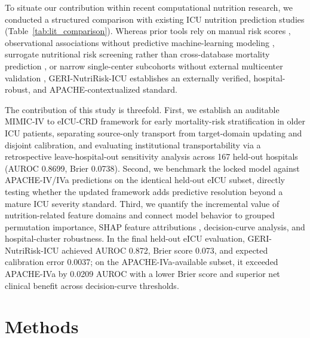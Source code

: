 \documentclass[utf8]{FrontiersinVancouver}
\newcommand{\re}[1]{#1}
\begin{document}
\re{To situate our contribution within recent computational nutrition research, we conducted a structured comparison with existing ICU nutrition prediction studies (Table~\ref{tab:lit_comparison}). Whereas prior tools rely on manual risk scores \citep{Heyland2011NUTRIC}, observational associations without predictive machine-learning modeling \citep{Peng2023GNRI}, surrogate nutritional risk screening rather than cross-database mortality prediction \citep{Zhang2026ENUTRIC}, or narrow single-center subcohorts without external multicenter validation \citep{Cao2026NIM}, GERI-NutriRisk-ICU establishes an externally verified, hospital-robust, and APACHE-contextualized standard.}

The contribution of this study is threefold. First, we establish an auditable MIMIC-IV to eICU-CRD framework for early mortality-risk stratification in older ICU patients, separating source-only transport from target-domain updating and disjoint calibration, \re{and evaluating institutional transportability via a retrospective leave-hospital-out sensitivity analysis across 167 held-out hospitals (AUROC 0.8699, Brier 0.0738)}. Second, we benchmark the locked model against APACHE-IV/IVa predictions on the identical held-out eICU subset, directly testing whether the updated framework adds predictive resolution beyond a mature ICU severity standard. Third, we quantify the incremental value of nutrition-related feature domains and connect model behavior to grouped permutation importance, \re{SHAP feature attributions \citep{Lundberg2020TreeSHAP}}, decision-curve analysis, and hospital-cluster robustness. In the final held-out eICU evaluation, GERI-NutriRisk-ICU achieved AUROC 0.872, Brier score 0.073, and expected calibration error \re{0.0037}; on the APACHE-IVa-available subset, it exceeded APACHE-IVa by 0.0209 AUROC with a lower Brier score \re{and superior net clinical benefit across decision-curve thresholds}. 

\section{Methods}
\end{document}
